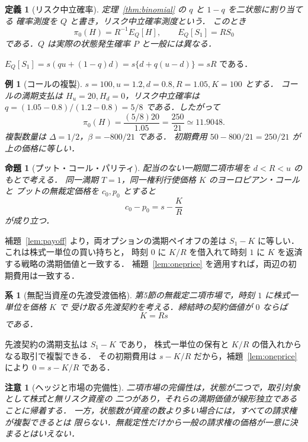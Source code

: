 \documentclass[a5paper,10pt,onecolumn]{jsarticle}
\makeatletter
\theoremstyle{mathnotetheorem}
\newtheorem{definition}[theorem]{定義}
\newtheorem{proposition}[theorem]{命題}
\newtheorem{corollary}[theorem]{系}
\newtheorem{example}[theorem]{例}
\newtheorem{remark}[theorem]{注意}
\renewcommand{\proofname}{証明}
\renewenvironment{proof}[1][\proofname]{%
  \par\pushQED{\qed}\normalfont\topsep4\p@\@plus2\p@\relax
  \trivlist\item[\hskip\labelsep\bfseries #1]\ignorespaces
}{\popQED\endtrivlist\@endpefalse}
\makeatother
\begin{document}
\begin{definition}[リスク中立確率]
定理~\ref{thm:binomial} の $q$ と $1-q$ を二状態に割り当てる
確率測度を $Q$ と書き，\emph{リスク中立確率測度}という．
このとき
\[
 \pi_0(H)=R^{-1}E_Q[H],\qquad E_Q[S_1]=RS_0
\]
である．$Q$ は実際の状態発生確率 $P$ と一般には異なる．
\end{definition}

\begin{proof}[後者の等式の確認]
$E_Q[S_1]=s(qu+(1-q)d)=s\{d+q(u-d)\}=sR$ である．\end{proof}

\begin{example}[コールの複製]
$s=100,u=1.2,d=0.8,R=1.05,K=100$ とする．
コールの満期支払は $H_u=20,H_d=0$，リスク中立確率は
$q=(1.05-0.8)/(1.2-0.8)=5/8$ である．したがって
\[
 \pi_0(H)=\frac{(5/8)20}{1.05}=\frac{250}{21}\simeq11.9048.
\]
複製数量は $\Delta=1/2$，$\beta=-800/21$ である．
初期費用 $50-800/21=250/21$ が上の価格に等しい．
\end{example}

\begin{proposition}[プット・コール・パリティ]\label{prop:pcparity}
配当のない一期間二項市場を $d<R<u$ のもとで考える．
同一満期 $T=1$，同一権利行使価格 $K$ のヨーロピアン・コールと
プットの無裁定価格を $c_0,p_0$ とすると
\[
 c_0-p_0=s-\frac{K}{R}
\]
が成り立つ．
\end{proposition}
\begin{proof}
補題~\ref{lem:payoff} より，両オプションの満期ペイオフの差は
$S_1-K$ に等しい．これは株式一単位の買い持ちと，
時刻 $0$ に $K/R$ を借入れて時刻 $1$ に $K$ を返済する戦略の満期価値と一致する．
補題~\ref{lem:oneprice} を適用すれば，両辺の初期費用は一致する．\end{proof}

\begin{corollary}[無配当資産の先渡受渡価格]
第5節の無裁定二項市場で，時刻 $1$ に株式一単位を価格 $K$ で
受け取る先渡契約を考える．締結時の契約価値が $0$ ならば
\[
 K=Rs
\]
である．
\end{corollary}
\begin{proof}
先渡契約の満期支払は $S_1-K$ であり，
株式一単位の保有と $K/R$ の借入れからなる取引で複製できる．
その初期費用は $s-K/R$ だから，補題~\ref{lem:oneprice} により
$0=s-K/R$ である．\end{proof}

\begin{remark}[ヘッジと市場の完備性]
二項市場の完備性は，状態が二つで，取引対象として株式と無リスク資産の
二つがあり，それらの満期価値が線形独立であることに帰着する．
一方，状態数が資産の数より多い場合には，すべての請求権が複製できるとは
限らない．無裁定性だけから一般の請求権の価格が一意に決まるとはいえない．
\end{remark}
\end{document}

